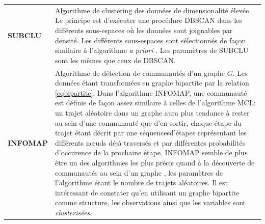 \begin{longtable}{ @{\hspace{-2cm}} >{\bfseries}p{}@{\hspace{1cm}}|>{\small}p{\textwidth}}
	\\[0.4cm]
     SUBCLU & \citep{Vista2004} Algorithme de clustering des données de dimensionalité élevée. Le principe est d'exécuter une procédure DBSCAN dans les différents sous-espaces où les données sont joignables par densité. Les différents sous-espaces sont sélectionnés de façon similaire à l'algorithme \textit{a priori} \citep{agrawal1994fast}. Les paramètres de SUBCLU sont les mêmes que ceux de DBSCAN.
	\\[0.4cm]
     INFOMAP & \citep{rosvall2008maps} Algorithme de détection de communautés d'un graphe $G$. Les données étant transformées en graphe bipartite par la relation \ref{eqbipartite}. Dans l'algorithme INFOMAP, une communauté est définie de façon assez similaire à celles de l'algorithme MCL: un trajet aléatoire dans un graphe aura plus tendance à rester au sein d'une communauté que d'en sortir, chaque étape du trajet étant décrit par une séquencesd'étapes représentant les différents nœuds déjà traversés et par différentes probabilités d'occurence de la prochaine étape. INFOMAP semble de plus être un des algorithmes les plus précis quand à la découverte de communautés au sein d'un graphe \citep{lancichinetti2009community}, les paramètres de l'algorithme étant le nombre de trajets aléatoires. Il est intéressant de constater qu'en utilisant un graphe bipartite comme structure, les observations ainsi que les variables sont \textit{clusterisées}.
\end{longtable}
    
